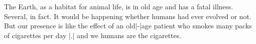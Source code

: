 The Earth, as a habitat for animal life, is in old age and
has a fatal illness. Several, in fact. It would be happening
whether humans had ever evolved or not. But our presence is
like the effect of an old|-|age patient who smokes many packs
of cigarettes per day |.| and we humans are the cigarettes.